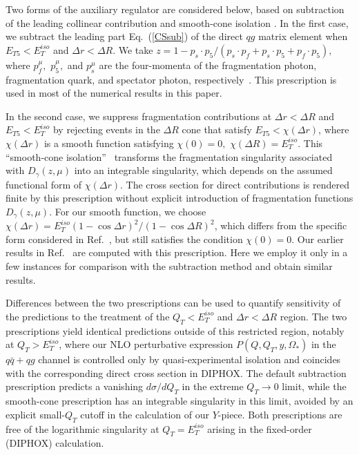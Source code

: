 \documentclass[12pt,english,aps,preprint,prd,letterpaper,fleqn,nofootinbib,showpacs,showkeys,tightenlines,floatfix]{revtex4}
\begin{document}
Two forms of the auxiliary regulator are considered below, based on
subtraction of the leading collinear contribution and smooth-cone
isolation \cite{Frixione:1998jh}. In the first case, we subtract
the leading part Eq.~(\ref{CSsub}) of the direct $qg$ matrix element
when $E_{T5}<E_{T}^{iso}$ and $\Delta r<\Delta R.$ We take 
$z=1-p_{s}\cdot p_{5}/(p_{s}\cdot p_{f}+p_{s}\cdot p_{5}+p_{f}\cdot p_{5}),$
where $p_{f}^{\mu},$ $p_{5}^{\mu},$ and $p_{s}^{\mu}$ are the four-momenta
of the fragmentation photon, fragmentation quark, and spectator photon,
respectively~\cite{Catani:1996vz}. This prescription is used in
most of the numerical results in this paper.

In the second case, we suppress fragmentation contributions at $\Delta r<\Delta R$
and $E_{T5}<E_{T}^{iso}$ by rejecting events in the $\Delta R$ cone
that satisfy $E_{T5}<\chi(\Delta r)$, where $\chi(\Delta r)$ is
a smooth function satisfying $\chi(0)=0,$ $\chi(\Delta R)=E_{T}^{iso}$.
This {}``smooth-cone isolation''~\cite{Frixione:1998jh} transforms
the fragmentation singularity associated with $D_{\gamma}(z,\mu)$
into an integrable singularity, which depends on the assumed functional
form of $\chi(\Delta r)$. The cross section for direct contributions
is rendered finite by this prescription without explicit introduction
of fragmentation functions $D_{\gamma}(z,\mu)$. For our smooth function,
we choose $\chi(\Delta r)=E_{T}^{iso}(1-\cos\Delta r)^{2}/(1-\cos\Delta R)^{2}$,
which differs from the specific form considered in Ref.~\cite{Frixione:1998jh},
but still satisfies the condition $\chi(0)=0.$ Our earlier results
in Ref.~\cite{Balazs:2006cc} are computed with this prescription.
Here we employ it only in a few instances for comparison with the
subtraction method and obtain similar results.

Differences between the two prescriptions can be used to quantify
sensitivity of the predictions to the treatment of the $Q_{T}<E_{T}^{iso}$
and $\Delta r<\Delta R$ region. The two prescriptions yield identical
predictions outside of this restricted region, notably at $Q_{T}>E_{T}^{iso}$,
where our NLO perturbative expression $P(Q,Q_{T},y,\Omega_{*})$ in 
the $q\bar{q}+qg$ channel
is controlled only by quasi-experimental isolation and coincides with
the corresponding direct cross section in DIPHOX. The default subtraction
prescription predicts a vanishing $d\sigma/dQ_{T}$ in the extreme
$Q_{T}\rightarrow0$ limit, while the smooth-cone prescription has
an integrable singularity in this limit, avoided by an explicit small-$Q_{T}$
cutoff in the calculation of our $Y$-piece. Both prescriptions are
free of the logarithmic singularity at $Q_{T}=E_{T}^{iso}$ arising
in the fixed-order (DIPHOX) calculation.
\end{document}
